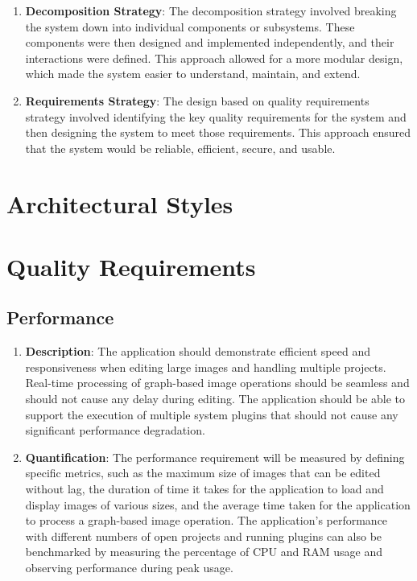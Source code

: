 \documentclass[11pt,a4paper]{article}
\begin{document}
\begin{enumerate}[label*=\arabic*.]
	\item[\textbullet] {\bf Decomposition Strategy}: The decomposition strategy
	involved breaking the system down into individual components or subsystems.
	These components were then designed and implemented independently, and their
	interactions were defined. This approach allowed for a more modular design,
	which made the system easier to understand, maintain, and extend.

	\item[\textbullet] {\bf Requirements Strategy}: The design based on quality
	requirements strategy involved identifying the key quality requirements for
	the system and then designing the system to meet those requirements. This
	approach ensured that the system would be reliable, efficient, secure, and
	usable.
\end{enumerate}


\section{Architectural Styles}


\pagebreak

\section{Quality Requirements}

\subsection{Performance}

\begin{enumerate}[label*=\arabic*.]
	\item[\textbullet] {\bf Description}: The application should demonstrate
	efficient speed and responsiveness when editing large images and handling
	multiple projects. Real-time processing of graph-based image operations
	should be seamless and should not cause any delay during editing. The
	application should be able to support the execution of multiple system
	plugins that should not cause any significant performance degradation.

	\item[\textbullet] {\bf Quantification}: The performance requirement will be
	measured by defining specific metrics, such as the maximum size of images
	that can be edited without lag, the duration of time it takes for the
	application to load and display images of various sizes, and the average
	time taken for the application to process a graph-based image operation. The
	application's performance with different numbers of open projects and
	running plugins can also be benchmarked by measuring the percentage of CPU
	and RAM usage and observing performance during peak usage.
\end{enumerate}
\end{document}
